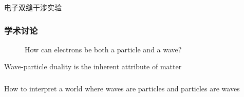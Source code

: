 \begin{frame}{电子双缝干涉实验}
\end{frame}

\begin{frame}
    \frametitle{学术讨论}
        \begin{figure}
            \centering
            {\color{red} How can electrons be both a particle and a wave?}
        \end{figure}
    \setcounter{subfigure}{0}
\end{frame}

\begin{frame}  
    \begin{tcolorbox3}[Conclusion]
    Wave-particle duality is the inherent attribute of matter
    \end{tcolorbox3} 
\end{frame} 

\begin{frame}
    \frametitle{}
    \centering
    {
      \large  How to interpret a world where waves are particles and particles are waves
    }
\end{frame}

